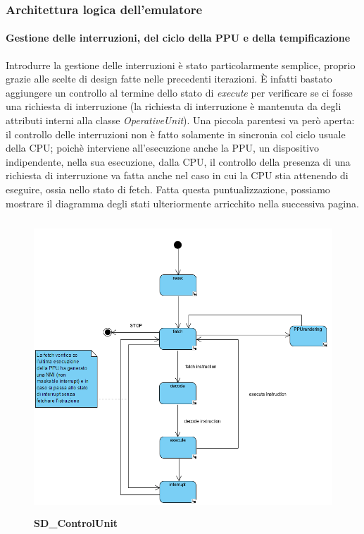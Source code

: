 \documentclass[11pt]{article}
\begin{document}
\subsubsection{Architettura logica dell'emulatore}
\paragraph{Gestione delle interruzioni, del ciclo della PPU e della tempificazione} Introdurre la gestione delle interruzioni è stato particolarmente semplice, proprio grazie alle scelte di design fatte nelle precedenti iterazioni. È infatti bastato aggiungere un controllo al termine dello stato di \emph{execute} per verificare se ci fosse una richiesta di interruzione (la richiesta di interruzione è mantenuta da degli attributi interni alla classe \emph{OperativeUnit}). Una piccola parentesi va però aperta: il controllo delle interruzioni non è fatto solamente in sincronia col ciclo usuale della CPU; poichè interviene all'esecuzione anche la PPU, un dispositivo indipendente, nella sua esecuzione, dalla CPU, il controllo della presenza di una richiesta di interruzione va fatta anche nel caso in cui la CPU stia attenendo di eseguire, ossia nello stato di fetch. Fatta questa puntualizzazione, possiamo mostrare il diagramma degli stati ulteriormente arricchito nella successiva pagina.
\begin{figure}[h]
\hspace*{-1.7cm}
\centering
\includegraphics[width=450px, height=415px]{SD_ControlUnit_2.png}\\
\small\textbf{SD\_ControlUnit}
\end{figure}
\end{document}
